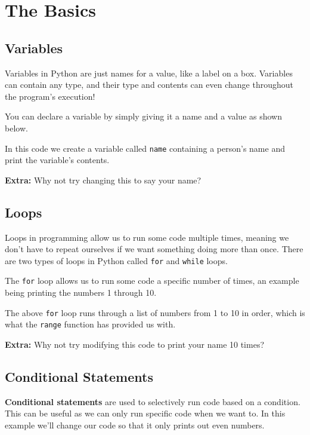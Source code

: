 \section{The Basics}
	\subsection{Variables}

		Variables in Python are just names for a value, like a label on a box. Variables can contain any type, and their type and contents can even change throughout the program's execution!

		You can declare a variable by simply giving it a name and a value as shown below.

		

		In this code we create a variable called \texttt{name} containing a person's name and print the variable's contents.

		\textbf{Extra:} Why not try changing this to say your name?

	\subsection{Loops}

		Loops in programming allow us to run some code multiple times, meaning we don't have to repeat ourselves if we want something doing more than once. There are two types of loops in Python called \texttt{for} and \texttt{while} loops.

		The \texttt{for} loop allows us to run some code a specific number of times, an example being printing the numbers 1 through 10.

	  

		The above \texttt{for} loop runs through a list of numbers from 1 to 10 in order, which is what the \texttt{range} function has provided us with.

		\textbf{Extra:} Why not try modifying this code to print your name 10 times?

	\subsection{Conditional Statements}

		\textbf{Conditional statements} are used to selectively run code based on a condition. This can be useful as we can only run specific code when we want to. In this example we'll change our code so that it only prints out even numbers.

